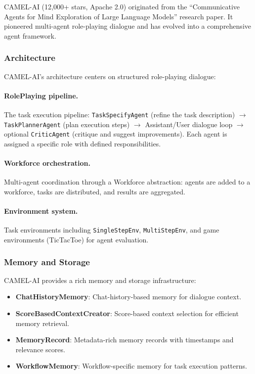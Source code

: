 CAMEL-AI (12,000+ stars, Apache 2.0) originated from the ``Communicative Agents for Mind Exploration of Large Language Models'' research paper. It pioneered multi-agent role-playing dialogue and has evolved into a comprehensive agent framework.

\subsubsection{Architecture}

CAMEL-AI's architecture centers on structured role-playing dialogue:

\paragraph{RolePlaying pipeline.}
The task execution pipeline: \texttt{TaskSpecifyAgent} (refine the task description) $\to$ \texttt{TaskPlannerAgent} (plan execution steps) $\to$ Assistant/User dialogue loop $\to$ optional \texttt{CriticAgent} (critique and suggest improvements). Each agent is assigned a specific role with defined responsibilities.

\paragraph{Workforce orchestration.}
Multi-agent coordination through a Workforce abstraction: agents are added to a workforce, tasks are distributed, and results are aggregated.

\paragraph{Environment system.}
Task environments including \texttt{SingleStepEnv}, \texttt{MultiStepEnv}, and game environments (TicTacToe) for agent evaluation.

\subsubsection{Memory and Storage}

CAMEL-AI provides a rich memory and storage infrastructure:
\begin{itemize}
    \item \textbf{ChatHistoryMemory}: Chat-history-based memory for dialogue context.
    \item \textbf{ScoreBasedContextCreator}: Score-based context selection for efficient memory retrieval.
    \item \textbf{MemoryRecord}: Metadata-rich memory records with timestamps and relevance scores.
    \item \textbf{WorkflowMemory}: Workflow-specific memory for task execution patterns.
\end{itemize}

